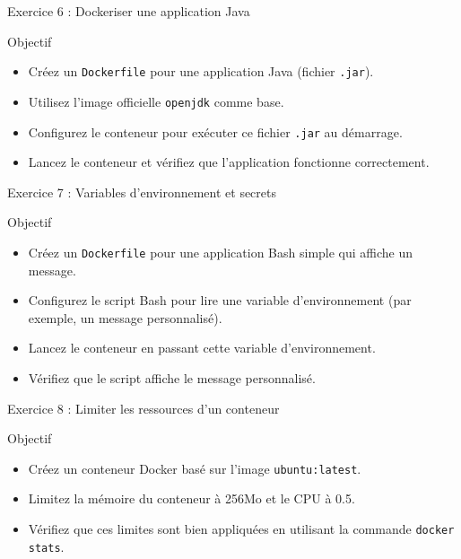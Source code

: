 \documentclass{beamer}
\begin{document}
\begin{frame}{Exercice 6 : Dockeriser une application Java}
\begin{block}{Objectif}
\begin{itemize}
  \item Créez un \texttt{Dockerfile} pour une application Java (fichier \texttt{.jar}).
  \item Utilisez l'image officielle \texttt{openjdk} comme base.
  \item Configurez le conteneur pour exécuter ce fichier \texttt{.jar} au démarrage.
  \item Lancez le conteneur et vérifiez que l'application fonctionne correctement.
\end{itemize}
\end{block}
\end{frame}

\begin{frame}{Exercice 7 : Variables d'environnement et secrets}
\begin{block}{Objectif}
\begin{itemize}
  \item Créez un \texttt{Dockerfile} pour une application Bash simple qui affiche un message.
  \item Configurez le script Bash pour lire une variable d'environnement (par exemple, un message personnalisé).
  \item Lancez le conteneur en passant cette variable d'environnement.
  \item Vérifiez que le script affiche le message personnalisé.
\end{itemize}
\end{block}
\end{frame}

\begin{frame}{Exercice 8 : Limiter les ressources d'un conteneur}
\begin{block}{Objectif}
\begin{itemize}
  \item Créez un conteneur Docker basé sur l'image \texttt{ubuntu:latest}.
  \item Limitez la mémoire du conteneur à 256Mo et le CPU à 0.5.
  \item Vérifiez que ces limites sont bien appliquées en utilisant la commande \texttt{docker stats}.
\end{itemize}
\end{block}
\end{frame}
\end{document}
